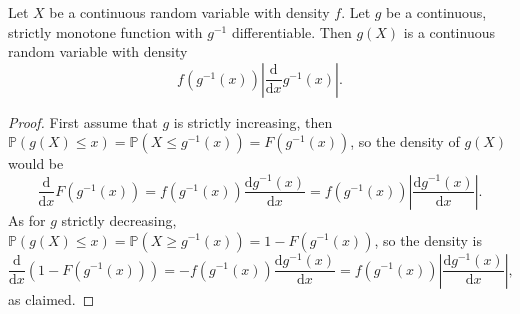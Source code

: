\begin{theorem}\label{thm:3.6}
    Let $X$ be a continuous random variable with density $f$.
    Let $g$ be a continuous, strictly monotone function with $g^{-1}$ differentiable.
    Then $g(X)$ is a continuous random variable with density
    \[
        f(g^{-1}(x))\left| \frac{\mathrm{d}}{\mathrm{d}x}g^{-1}(x) \right|. 
    \]
\end{theorem}
\begin{proof}
    First assume that $g$ is strictly increasing, then $\mathbb P(g(X)\le x)=\mathbb P(X\le g^{-1}(x))=F(g^{-1}(x))$, so the density of $g(X)$ would be
    $$\frac{\mathrm d}{\mathrm dx}F(g^{-1}(x))=f(g^{-1}(x))\frac{\mathrm dg^{-1}(x)}{\mathrm dx}=f(g^{-1}(x))\left|\frac{\mathrm dg^{-1}(x)}{\mathrm dx}\right|.$$
    As for $g$ strictly decreasing, $\mathbb P(g(X)\le x)=\mathbb P(X\ge g^{-1}(x))=1-F(g^{-1}(x))$, so the density is
    $$\frac{\mathrm d}{\mathrm dx}(1-F(g^{-1}(x)))=-f(g^{-1}(x))\frac{\mathrm dg^{-1}(x)}{\mathrm dx}=f(g^{-1}(x))\left|\frac{\mathrm dg^{-1}(x)}{\mathrm dx}\right|,$$
    as claimed.
\end{proof}

